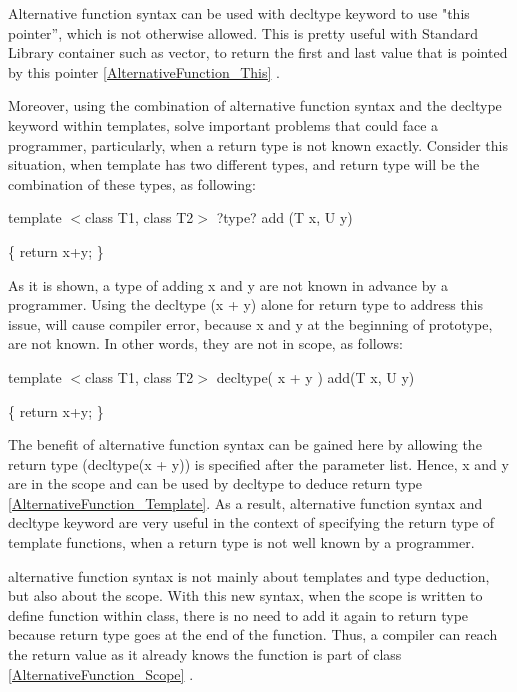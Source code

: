 \documentclass[11pt]{report}
\begin{document}
Alternative function syntax can be used with decltype keyword to use "this pointer”, which is not otherwise allowed. This is pretty useful with Standard Library container such as vector, to return the first and last value that is pointed by this pointer \ref{AlternativeFunction_This} \cite{ISO:2011:Cpplanguage}. 
\newline

Moreover, using the combination of alternative function syntax and the decltype keyword within templates, solve important problems that could face a programmer, particularly, when a return type is not known exactly.  Consider this situation, when template has two different types, and return type will be the combination of these types, as following:
\begin{center}
template $<$class T1, class T2$>$  ?type? add (T x, U y) 
\newline

\{ return x+y; \}
\end{center}

As it is shown, a type of adding x and y are not known in advance by a programmer. Using the decltype (x + y) alone for return type to address this issue, will cause compiler error, because x and y at the beginning of prototype, are not known.  In other words, they are not in scope, as follows:

\begin{center}
template $<$class T1, class T2$>$  decltype( x + y ) add(T x, U y)
\newline

\{ return x+y; \}
\end{center}

The benefit of alternative function syntax can be gained here by allowing the return type (decltype(x + y)) is specified after the parameter list. Hence, x and y are in the scope and can be used by decltype to deduce return type \ref{AlternativeFunction_Template}. As a result, alternative function syntax and decltype keyword are very useful in the context of specifying the return type of template functions, when a return type is not well known by a programmer\cite{Prata:2012:Cpp}.
\newline

alternative function syntax is not mainly about templates and type deduction, but also about the scope.  With this new syntax, when the scope is written to define function within class, there is no need to add it again to return type because return type goes at the end of the function. Thus, a compiler can reach the return value as it already knows the function is part of class \ref{AlternativeFunction_Scope} \cite{Allain:2011:FutureCpp}.
\end{document}
